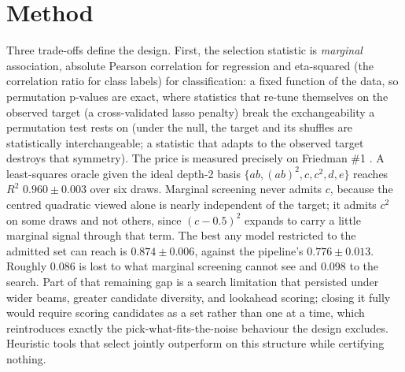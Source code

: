 \documentclass[
]{article}
\begin{document}
\hypertarget{method}{%
\section{Method}\label{method}}

Three trade-offs define the design. First, the selection statistic is
\emph{marginal} association, absolute Pearson correlation for regression
and eta-squared (the correlation ratio for class labels) for
classification: a fixed function of the data, so permutation p-values
are exact, where statistics that re-tune themselves on the observed
target (a cross-validated lasso penalty) break the exchangeability a
permutation test rests on (under the null, the target and its shuffles
are statistically interchangeable; a statistic that adapts to the
observed target destroys that symmetry). The price is measured precisely
on Friedman \#1 \citep{friedman1991}. A least-squares oracle given the
ideal depth-2 basis \(\{ab, (ab)^2, c, c^2, d, e\}\) reaches \(R^2\)
\(0.960 \pm 0.003\) over six draws. Marginal screening never admits
\(c\), because the centred quadratic viewed alone is nearly independent
of the target; it admits \(c^2\) on some draws and not others, since
\((c-0.5)^2\) expands to carry a little marginal signal through that
term. The best any model restricted to the admitted set can reach is
\(0.874 \pm 0.006\), against the pipeline's \(0.776 \pm 0.013\). Roughly
0.086 is lost to what marginal screening cannot see and 0.098 to the
search. Part of that remaining gap is a search limitation that persisted
under wider beams, greater candidate diversity, and lookahead scoring;
closing it fully would require scoring candidates as a set rather than
one at a time, which reintroduces exactly the pick-what-fits-the-noise
behaviour the design excludes. Heuristic tools that select jointly
outperform on this structure while certifying nothing.
\end{document}

